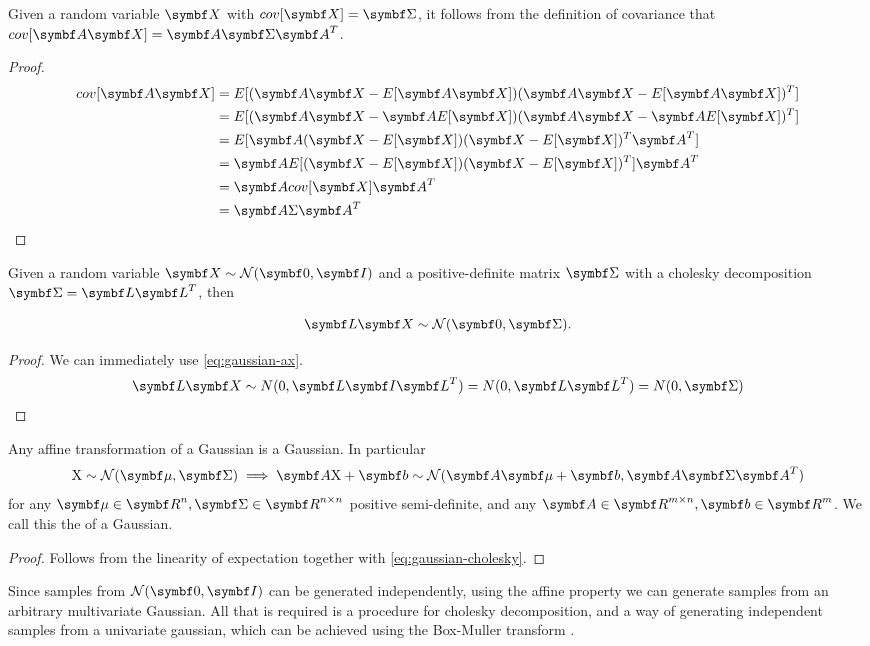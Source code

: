 \begin{thm}
  Given a random variable $\mX$ with $cov[\mX] = \mSigma$, it follows from
  the definition of covariance that $cov[\mA \mX] = \mA \mSigma \mA^T$.
\end{thm}

\begin{proof}
  \begin{align}
    cov[\mA \mX] &= E[(\mA \mX - E[\mA \mX])(\mA \mX - E[\mA \mX])^T] \\
                 &= E[(\mA \mX - \mA E[\mX])(\mA \mX - \mA E[\mX])^T] \\
                 &= E[\mA (\mX - E[\mX])(\mX - E[\mX])^T \mA^T] \\
                 &= \mA E[(\mX - E[\mX])(\mX - E[\mX])^T] \mA^T \\
                 &= \mA cov[\mX] \mA^T \\
                 &= \mA \Sigma \mA^T
    \label{eq:gaussian-ax}
  \end{align}
\end{proof}

\begin{thm}
  Given a random variable $\mX \sim \gN(\mZero, \mI)$ and a positive-definite matrix
  $\mSigma$ with a cholesky decomposition $\mSigma = \mL \mL^T$, then

  \begin{equation}
    \mL \mX \sim \gN(\mZero, \mSigma).
    \label{eq:gaussian-cholesky}
  \end{equation}
\end{thm}

\begin{proof}
  We can immediately use \eqref{eq:gaussian-ax}.
  \begin{align}
    \mL \mX \sim N(0, \mL \mI \mL^T) = N(0, \mL \mL^T) = N(0, \mSigma)
  \end{align}
\end{proof}

\begin{thm}
  Any affine transformation of a Gaussian is a Gaussian. In particular
  $$
    \rX \sim \gN(\vmu, \mSigma) \implies \mA \rX + \vb \sim \gN(\mA \vmu + \vb, \mA \mSigma \mA^T)
  $$
  for any $\vmu \in \mR^n, \mSigma \in \mR^{n \times n}$ positive
  semi-definite, and any $\mA \in \mR^{m \times n}, \vb \in \mR^m$.
  We call this the  of a Gaussian.
\end{thm}

\begin{proof}
  Follows from the linearity of expectation together with \autoref{eq:gaussian-cholesky}.
\end{proof}

Since samples from $\gN(\mZero, \mI)$ can be generated independently, using the
affine property we can generate samples from an arbitrary multivariate
Gaussian. All that is required is a procedure for cholesky decomposition, and a
way of generating independent samples from a univariate gaussian, which can be
achieved using the Box-Muller transform \citep{box-muller1958note}.
